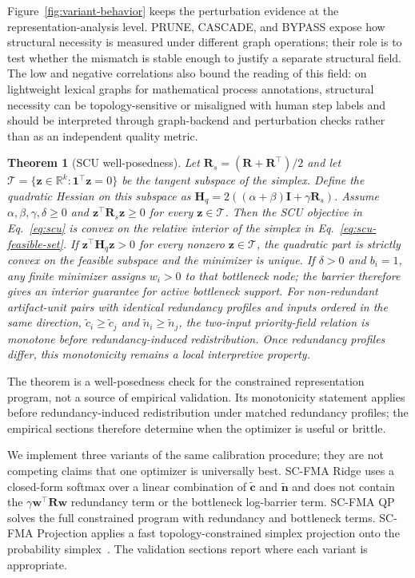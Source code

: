 \documentclass[pdflatex,sn-mathphys-num,iicol]{sn-jnl}
\newtheorem{theorem}{Theorem}[section]
\begin{document}
Figure~\ref{fig:variant-behavior} keeps the perturbation evidence at the representation-analysis level. PRUNE, CASCADE, and BYPASS expose how structural necessity is measured under different graph operations; their role is to test whether the mismatch is stable enough to justify a separate structural field. The low and negative correlations also bound the reading of this field: on lightweight lexical graphs for mathematical process annotations, structural necessity can be topology-sensitive or misaligned with human step labels and should be interpreted through graph-backend and perturbation checks rather than as an independent quality metric.

\begin{theorem}[SCU well-posedness]
\label{thm:scu-well-posedness}
Let $\mathbf{R}_{s}=(\mathbf{R}+\mathbf{R}^{\top})/2$ and let $\mathcal{T}=\{\mathbf{z}\in\mathbb{R}^{k}:\mathbf{1}^{\top}\mathbf{z}=0\}$ be the tangent subspace of the simplex. Define the quadratic Hessian on this subspace as $\mathbf{H}_{q}=2((\alpha+\beta)\mathbf{I}+\gamma\mathbf{R}_{s})$. Assume $\alpha,\beta,\gamma,\delta \ge 0$ and $\mathbf{z}^{\top}\mathbf{R}_{s}\mathbf{z}\ge 0$ for every $\mathbf{z}\in\mathcal{T}$. Then the SCU objective in Eq.~\ref{eq:scu} is convex on the relative interior of the simplex in Eq.~\ref{eq:scu-feasible-set}. If $\mathbf{z}^{\top}\mathbf{H}_{q}\mathbf{z}>0$ for every nonzero $\mathbf{z}\in\mathcal{T}$, the quadratic part is strictly convex on the feasible subspace and the minimizer is unique. If $\delta>0$ and $b_i=1$, any finite minimizer assigns $w_i>0$ to that bottleneck node; the barrier therefore gives an interior guarantee for active bottleneck support. For non-redundant artifact-unit pairs with identical redundancy profiles and inputs ordered in the same direction, $\tilde c_i\ge \tilde c_j$ and $\tilde n_i\ge \tilde n_j$, the two-input priority-field relation is monotone before redundancy-induced redistribution. Once redundancy profiles differ, this monotonicity remains a local interpretive property.
\end{theorem}

The theorem is a well-posedness check for the constrained representation program, not a source of empirical validation. Its monotonicity statement applies before redundancy-induced redistribution under matched redundancy profiles; the empirical sections therefore determine when the optimizer is useful or brittle.

We implement three variants of the same calibration procedure; they are not competing claims that one optimizer is universally best. SC-FMA Ridge uses a closed-form softmax over a linear combination of $\tilde{\mathbf{c}}$ and $\tilde{\mathbf{n}}$ and does not contain the $\gamma\mathbf{w}^{\top}\mathbf{R}\mathbf{w}$ redundancy term or the bottleneck log-barrier term. SC-FMA QP solves the full constrained program with redundancy and bottleneck terms. SC-FMA Projection applies a fast topology-constrained simplex projection onto the probability simplex~\cite{wang2013projection}. The validation sections report where each variant is appropriate.
\end{document}
